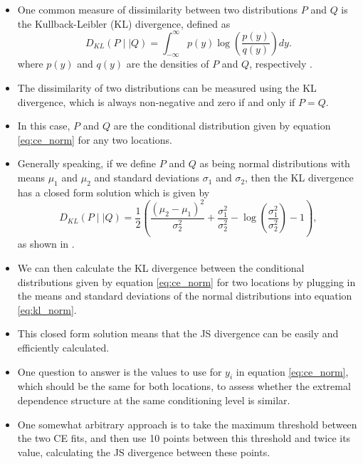 \documentclass{article}
\numberwithin{equation}{section}
\begin{document}
\begin{itemize}
  \item One common measure of dissimilarity between two distributions $P$ and $Q$ is the Kullback-Leibler (KL) divergence, defined as
    \begin{equation} \label{eq:kl}
      D_{KL}(P \mid\mid Q) = \int_{-\infty}^{\infty} p(y) \log\left(\frac{p(y)}{q(y)}\right) dy.
    \end{equation}
    where $p(y)$ and $q(y)$ are the densities of $P$ and $Q$, respectively \citet{Kullback1951}.
  \item The dissimilarity of two distributions can be measured using the KL divergence, which is always non-negative and zero if and only if $P = Q$.
  \item In this case, $P$ and $Q$ are the conditional distribution given by equation \ref{eq:ce_norm} for any two locations.
  \item Generally speaking, if we define $P$ and $Q$ as being normal distributions with means $\mu_1$ and $\mu_2$ and standard deviations $\sigma_1$ and $\sigma_2$, then the KL divergence has a closed form solution which is given by
    \begin{equation} \label{eq:kl_norm}
      D_{KL}(P \mid\mid Q) = \frac{1}{2} \left( \frac{(\mu_2 - \mu_1)^2}{\sigma_2^2} + \frac{\sigma_1^2}{\sigma_2^2} - \log{(\frac{\sigma_1^2}{\sigma_2^2})} - 1 \right),
    \end{equation}
    as shown in \citet{Soch2020_norm_kl}.
  \item We can then calculate the KL divergence between the conditional distributions given by equation \ref{eq:ce_norm} for two locations by plugging in the means and standard deviations of the normal distributions into equation \ref{eq:kl_norm}. 
  \item This closed form solution means that the JS divergence can be easily and efficiently calculated.
  \item One question to answer is the values to use for $y_i$ in equation \ref{eq:ce_norm}, which should be the same for both locations, to assess whether the extremal dependence structure at the same conditioning level is similar.
  \item One somewhat arbitrary approach is to take the maximum threshold between the two CE fits, and then use 10 points between this threshold and twice its value, calculating the JS divergence between these points.
\end{itemize}
\end{document}
